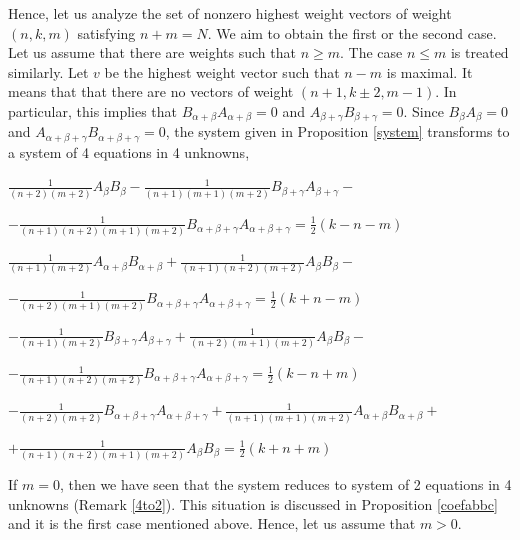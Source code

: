 \documentclass[twoside,a4paper,12pt]{article}
\theoremstyle{definition}
\newcommand{\ds}{\displaystyle}
\begin{document}
Hence, let us analyze the set of nonzero highest weight vectors of weight
$(n,k,m)$ satisfying $n+m=N$. We aim to obtain the first or the second
case. Let us assume that there are weights such that $n\geq m$.
The case $n\leq m$ is treated similarly.
Let $v$ be the highest weight vector such that $n-m$ is maximal.
It means that that there are no vectors of weight $(n+1,k\pm2,m-1)$.
In particular, this implies that $B_{\alpha+\beta}A_{\alpha+\beta}=0$
and $A_{\beta+\gamma}B_{\beta+\gamma}=0$. Since $B_\beta A_\beta=0$ and
$A_{\alpha+\beta+\gamma}B_{\alpha+\beta+\gamma}=0$, the system given in
Proposition \ref{system} transforms to a system of 4 equations in 4 unknowns,
\begin{flushleft}
	$\ds \frac1{(n+2)(m+2)}A_\beta B_\beta
	-\frac1{(n+1)(m+1)(m+2)}B_{\beta+\gamma}A_{\beta+\gamma}-$
\end{flushleft}
\begin{flushright}
	$\ds -\frac1{(n+1)(n+2)(m+1)(m+2)}
	B_{\alpha+\beta+\gamma}A_{\alpha+\beta+\gamma}=\frac12(k-n-m)$
\end{flushright}
\begin{flushleft}
	$\ds \frac1{(n+1)(m+2)}A_{\alpha+\beta}B_{\alpha+\beta}
	+\frac1{(n+1)(n+2)(m+2)}A_\beta B_\beta-$
\end{flushleft}
\begin{flushright}
	$\ds -\frac1{(n+2)(m+1)(m+2)}
	B_{\alpha+\beta+\gamma}A_{\alpha+\beta+\gamma}=\frac12(k+n-m)$
\end{flushright}
\begin{flushleft}
	$\ds -\frac1{(n+1)(m+2)}B_{\beta+\gamma}A_{\beta+\gamma}
	+\frac1{(n+2)(m+1)(m+2)}A_\beta B_\beta-$
\end{flushleft}
\begin{flushright}
	$\ds -\frac1{(n+1)(n+2)(m+2)}
	B_{\alpha+\beta+\gamma}A_{\alpha+\beta+\gamma}=\frac12(k-n+m)$
\end{flushright}
\begin{flushleft}
	$\ds -\frac1{(n+2)(m+2)}B_{\alpha+\beta+\gamma}A_{\alpha+\beta+\gamma}
	+\frac1{(n+1)(m+1)(m+2)}A_{\alpha+\beta}B_{\alpha+\beta}+$
\end{flushleft}
\begin{flushright}
	$\ds +\frac1{(n+1)(n+2)(m+1)(m+2)}A_\beta B_\beta=\frac12(k+n+m)$
\end{flushright}
If $m=0$, then we have seen that the system reduces to system of 2 equations in
4 unknowns (Remark \ref{4to2}). This situation is discussed in
Proposition \ref{coefabbc} and it is the first case mentioned above.
Hence, let us assume that $m>0$.
\end{document}
